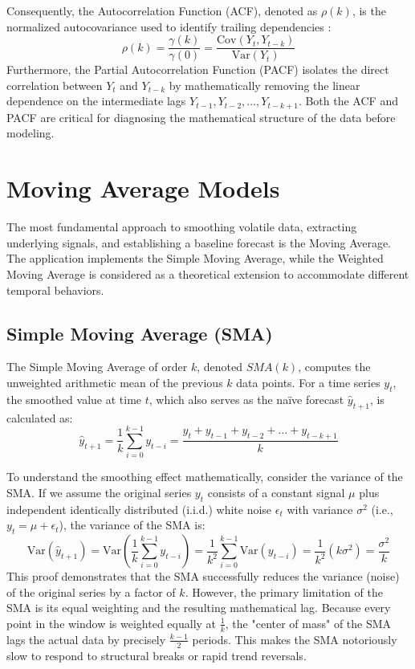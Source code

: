 Consequently, the Autocorrelation Function (ACF), denoted as $\rho(k)$, is the normalized autocovariance used to identify trailing dependencies \cite{Hamilton1994}:
\begin{equation}
    \rho(k) = \frac{\gamma(k)}{\gamma(0)} = \frac{\text{Cov}(Y_t, Y_{t-k})}{\text{Var}(Y_t)}
\end{equation}
Furthermore, the Partial Autocorrelation Function (PACF) isolates the direct correlation between $Y_t$ and $Y_{t-k}$ by mathematically removing the linear dependence on the intermediate lags $Y_{t-1}, Y_{t-2}, \dots, Y_{t-k+1}$. Both the ACF and PACF are critical for diagnosing the mathematical structure of the data before modeling.

\section{Moving Average Models}
The most fundamental approach to smoothing volatile data, extracting underlying signals, and establishing a baseline forecast is the Moving Average. The application implements the Simple Moving Average, while the Weighted Moving Average is considered as a theoretical extension to accommodate different temporal behaviors.

\subsection{Simple Moving Average (SMA)}
The Simple Moving Average of order $k$, denoted $SMA(k)$, computes the unweighted arithmetic mean of the previous $k$ data points. For a time series $y_t$, the smoothed value at time $t$, which also serves as the na\"ive forecast $\hat{y}_{t+1}$, is calculated as:
\begin{equation}
    \hat{y}_{t+1} = \frac{1}{k} \sum_{i=0}^{k-1} y_{t-i} = \frac{y_t + y_{t-1} + y_{t-2} + \dots + y_{t-k+1}}{k}
\end{equation}

To understand the smoothing effect mathematically, consider the variance of the SMA. If we assume the original series $y_t$ consists of a constant signal $\mu$ plus independent identically distributed (i.i.d.) white noise $\epsilon_t$ with variance $\sigma^2$ (i.e., $y_t = \mu + \epsilon_t$), the variance of the SMA is:
\begin{equation}
    \text{Var}(\hat{y}_{t+1}) = \text{Var}\left( \frac{1}{k} \sum_{i=0}^{k-1} y_{t-i} \right) = \frac{1}{k^2} \sum_{i=0}^{k-1} \text{Var}(y_{t-i}) = \frac{1}{k^2} (k \sigma^2) = \frac{\sigma^2}{k}
\end{equation}
This proof demonstrates that the SMA successfully reduces the variance (noise) of the original series by a factor of $k$. However, the primary limitation of the SMA is its equal weighting and the resulting mathematical lag. Because every point in the window is weighted equally at $\frac{1}{k}$, the "center of mass" of the SMA lags the actual data by precisely $\frac{k-1}{2}$ periods. This makes the SMA notoriously slow to respond to structural breaks or rapid trend reversals.

